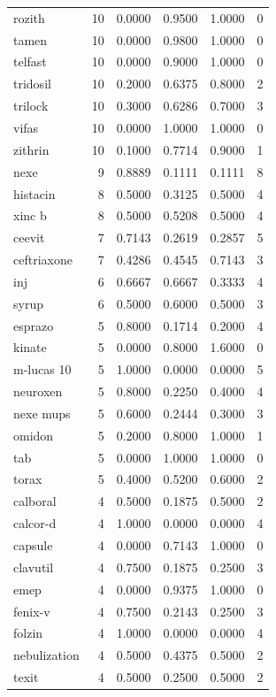 \begin{longtable}{p{3.0cm}rrrrr}
rozith & 10 & 0.0000 & 0.9500 & 1.0000 & 0 \\
tamen & 10 & 0.0000 & 0.9800 & 1.0000 & 0 \\
telfast & 10 & 0.0000 & 0.9000 & 1.0000 & 0 \\
tridosil & 10 & 0.2000 & 0.6375 & 0.8000 & 2 \\
trilock & 10 & 0.3000 & 0.6286 & 0.7000 & 3 \\
vifas & 10 & 0.0000 & 1.0000 & 1.0000 & 0 \\
zithrin & 10 & 0.1000 & 0.7714 & 0.9000 & 1 \\
nexe & 9 & 0.8889 & 0.1111 & 0.1111 & 8 \\
histacin & 8 & 0.5000 & 0.3125 & 0.5000 & 4 \\
xinc b & 8 & 0.5000 & 0.5208 & 0.5000 & 4 \\
ceevit & 7 & 0.7143 & 0.2619 & 0.2857 & 5 \\
ceftriaxone & 7 & 0.4286 & 0.4545 & 0.7143 & 3 \\
inj & 6 & 0.6667 & 0.6667 & 0.3333 & 4 \\
syrup & 6 & 0.5000 & 0.6000 & 0.5000 & 3 \\
esprazo & 5 & 0.8000 & 0.1714 & 0.2000 & 4 \\
kinate & 5 & 0.0000 & 0.8000 & 1.6000 & 0 \\
m-lucas 10 & 5 & 1.0000 & 0.0000 & 0.0000 & 5 \\
neuroxen & 5 & 0.8000 & 0.2250 & 0.4000 & 4 \\
nexe mups & 5 & 0.6000 & 0.2444 & 0.3000 & 3 \\
omidon & 5 & 0.2000 & 0.8000 & 1.0000 & 1 \\
tab & 5 & 0.0000 & 1.0000 & 1.0000 & 0 \\
torax & 5 & 0.4000 & 0.5200 & 0.6000 & 2 \\
calboral & 4 & 0.5000 & 0.1875 & 0.5000 & 2 \\
calcor-d & 4 & 1.0000 & 0.0000 & 0.0000 & 4 \\
capsule & 4 & 0.0000 & 0.7143 & 1.0000 & 0 \\
clavutil & 4 & 0.7500 & 0.1875 & 0.2500 & 3 \\
emep & 4 & 0.0000 & 0.9375 & 1.0000 & 0 \\
fenix-v & 4 & 0.7500 & 0.2143 & 0.2500 & 3 \\
folzin & 4 & 1.0000 & 0.0000 & 0.0000 & 4 \\
nebulization & 4 & 0.5000 & 0.4375 & 0.5000 & 2 \\
texit & 4 & 0.5000 & 0.2500 & 0.5000 & 2 \\

\end{longtable}
